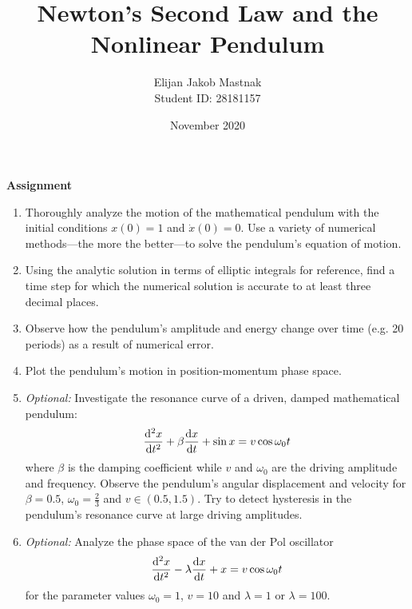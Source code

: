 \documentclass[11pt, a4paper]{article}
\begin{document}
\title{Newton's Second Law and the Nonlinear Pendulum}
\author{Elijan Jakob Mastnak\\[1mm]\small{Student ID: 28181157}}
\date{November 2020}
\maketitle

\tableofcontents

\newpage
\begin{center}
\textbf{Assignment}
\begin{enumerate}
	\item Thoroughly analyze the motion of the mathematical pendulum with the initial conditions $ x(0) = 1 $ and $ \dot{x}(0) = 0 $. Use a variety of numerical methods---the more the better---to solve the pendulum's equation of motion. 
	
	\item Using the analytic solution in terms of elliptic integrals for reference, find a time step for which the numerical solution is accurate to at least three decimal places.
	
	\item Observe how the pendulum's amplitude and energy change over time (e.g. 20 periods) as a result of numerical error.
	
	\item Plot the pendulum's motion in position-momentum phase space. 
	
	\item \textit{Optional:} Investigate the resonance curve of a driven, damped mathematical pendulum:
	\begin{equation*}
		\dv[2]{x}{t} + \beta \dv{x}{t} + \sin x = v \cos \omega_{0}t
	\end{equation*}
	where $ \beta $ is the damping coefficient while $ v $ and $ \omega_{0} $ are the driving amplitude and frequency. Observe the pendulum's angular displacement and velocity for $ \beta = 0.5 $, $ \omega_{0} = \frac{2}{3} $ and $ v \in (0.5, 1.5) $. Try to detect hysteresis in the pendulum's resonance curve at large driving amplitudes. 
	
	\item \textit{Optional:} Analyze the phase space of the van der Pol oscillator
	\begin{equation*}
		\dv[2]{x}{t} - \lambda \dv{x}{t}(1 - x^{2}) + x = v \cos \omega_{0}t
	\end{equation*}
	for the parameter values $ \omega_{0} = 1 $, $ v = 10 $ and $ \lambda = 1 $ or $ \lambda = 100 $. 
	
	
\end{enumerate}
\end{center}
\end{document}
